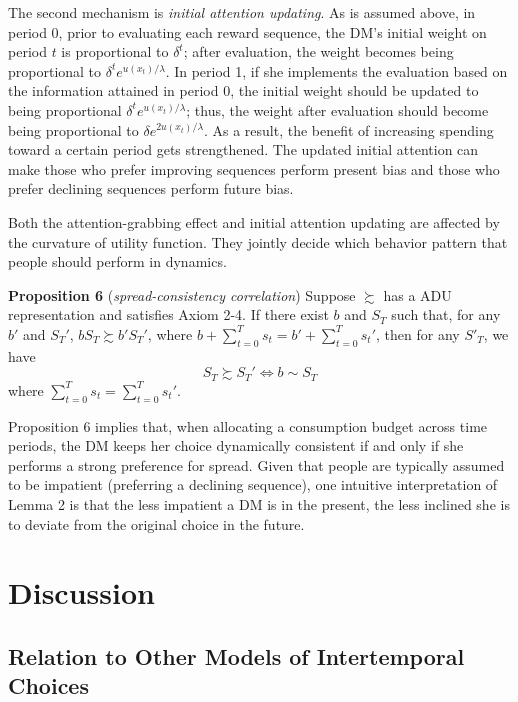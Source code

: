 \documentclass[
  12pt,
]{article}
\begin{document}
The second mechanism is \emph{initial attention updating}. As is assumed
above, in period 0, prior to evaluating each reward sequence, the DM's
initial weight on period \(t\) is proportional to \(\delta^t\); after
evaluation, the weight becomes being proportional to
\(\delta^t e^{u(x_t)/\lambda}\). In period 1, if she implements the
evaluation based on the information attained in period 0, the initial
weight should be updated to being proportional
\(\delta^t e^{u(x_t)/\lambda}\); thus, the weight after evaluation
should become being proportional to \(\delta e^{2u(x_t)/\lambda}\). As a
result, the benefit of increasing spending toward a certain period gets
strengthened. The updated initial attention can make those who prefer
improving sequences perform present bias and those who prefer declining
sequences perform future bias.

Both the attention-grabbing effect and initial attention updating are
affected by the curvature of utility function. They jointly decide which
behavior pattern that people should perform in dynamics.

\textbf{Proposition 6} (\emph{spread-consistency correlation}) Suppose
\(\succsim\) has a ADU representation and satisfies Axiom 2-4. If there
exist \(b\) and \(S_T\) such that, for any \(b'\) and \(S_T'\),
\(bS_T\succsim b'S_T'\), where
\(b+\sum_{t=0}^Ts_t=b'+\sum_{t=0}^Ts_t'\), then for any \(S'_T\), we
have \[S_T \succsim S_T' \Longleftrightarrow b\sim S_T\]where
\(\sum_{t=0}^Ts_t=\sum_{t=0}^Ts_t'\).

Proposition 6 implies that, when allocating a consumption budget across
time periods, the DM keeps her choice dynamically consistent if and only
if she performs a strong preference for spread. Given that people are
typically assumed to be impatient (preferring a declining sequence), one
intuitive interpretation of Lemma 2 is that the less impatient a DM is
in the present, the less inclined she is to deviate from the original
choice in the future.

\hypertarget{discussion}{%
\section{Discussion}\label{discussion}}

\hypertarget{relation-to-other-models-of-intertemporal-choices}{%
\subsection{Relation to Other Models of Intertemporal
Choices}\label{relation-to-other-models-of-intertemporal-choices}}
\end{document}
